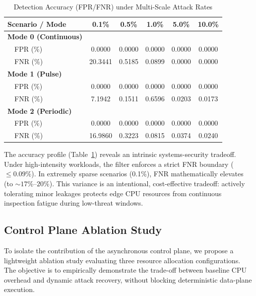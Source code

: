 \documentclass[conference]{IEEEtran}
\begin{document}
\begin{table}[htbp]
\caption{Detection Accuracy (FPR/FNR) under Multi-Scale Attack Rates}
\label{tab:fpr_fnr}
\centering
\footnotesize
\setlength{\tabcolsep}{4.5pt}
\begin{tabular}{@{}p{2.7cm}ccccc@{}}
\toprule
\textbf{Scenario / Mode} & \textbf{0.1\%} & \textbf{0.5\%} & \textbf{1.0\%} & \textbf{5.0\%} & \textbf{10.0\%} \\
\midrule
\textbf{Mode 0 (Continuous)} & & & & & \\
~~FPR (\%) & 0.0000 & 0.0000 & 0.0000 & 0.0000 & 0.0000 \\
~~FNR (\%) & 20.3441 & 0.5185 & 0.0899 & 0.0000 & 0.0000 \\
\midrule
\textbf{Mode 1 (Pulse)} & & & & & \\
~~FPR (\%) & 0.0000 & 0.0000 & 0.0000 & 0.0000 & 0.0000 \\
~~FNR (\%) & 7.1942 & 0.1511 & 0.6596 & 0.0203 & 0.0173 \\
\midrule
\textbf{Mode 2 (Periodic)} & & & & & \\
~~FPR (\%) & 0.0000 & 0.0000 & 0.0000 & 0.0000 & 0.0000 \\
~~FNR (\%) & 16.9860 & 0.3223 & 0.0815 & 0.0374 & 0.0240 \\
\bottomrule
\end{tabular}
\end{table}

The accuracy profile (Table~\ref{tab:fpr_fnr}) reveals an intrinsic systems-security tradeoff. Under high-intensity workloads, the filter enforces a strict FNR boundary ($\le 0.09\%$). In extremely sparse scenarios (0.1\%), FNR mathematically elevates (to $\sim17\%$--$20\%$). This variance is an intentional, cost-effective tradeoff: actively tolerating minor leakages protects edge CPU resources from continuous inspection fatigue during low-threat windows.

\subsection{Control Plane Ablation Study}

To isolate the contribution of the asynchronous control plane, we propose a lightweight ablation study evaluating three resource allocation configurations. The objective is to empirically demonstrate the trade-off between baseline CPU overhead and dynamic attack recovery, without blocking deterministic data-plane execution.
\end{document}
